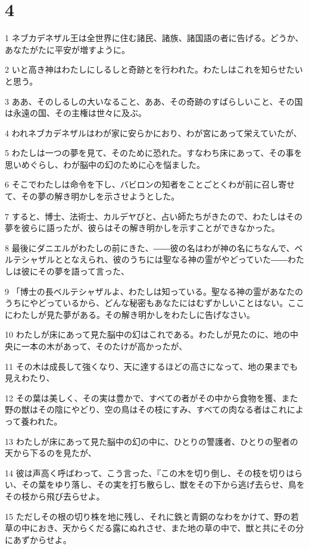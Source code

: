 \chapter{4}

\par 1 ネブカデネザル王は全世界に住む諸民、諸族、諸国語の者に告げる。どうか、あなたがたに平安が増すように。
\par 2 いと高き神はわたしにしるしと奇跡とを行われた。わたしはこれを知らせたいと思う。
\par 3 ああ、そのしるしの大いなること、ああ、その奇跡のすばらしいこと、その国は永遠の国、その主権は世々に及ぶ。
\par 4 われネブカデネザルはわが家に安らかにおり、わが宮にあって栄えていたが、
\par 5 わたしは一つの夢を見て、そのために恐れた。すなわち床にあって、その事を思いめぐらし、わが脳中の幻のために心を悩ました。
\par 6 そこでわたしは命令を下し、バビロンの知者をことごとくわが前に召し寄せて、その夢の解き明かしを示させようとした。
\par 7 すると、博士、法術士、カルデヤびと、占い師たちがきたので、わたしはその夢を彼らに語ったが、彼らはその解き明かしを示すことができなかった。
\par 8 最後にダニエルがわたしの前にきた、――彼の名はわが神の名にちなんで、ベルテシャザルととなえられ、彼のうちには聖なる神の霊がやどっていた――わたしは彼にその夢を語って言った、
\par 9 「博士の長ベルテシャザルよ、わたしは知っている。聖なる神の霊があなたのうちにやどっているから、どんな秘密もあなたにはむずかしいことはない。ここにわたしが見た夢がある。その解き明かしをわたしに告げなさい。
\par 10 わたしが床にあって見た脳中の幻はこれである。わたしが見たのに、地の中央に一本の木があって、そのたけが高かったが、
\par 11 その木は成長して強くなり、天に達するほどの高さになって、地の果までも見えわたり、
\par 12 その葉は美しく、その実は豊かで、すべての者がその中から食物を獲、また野の獣はその陰にやどり、空の鳥はその枝にすみ、すべての肉なる者はこれによって養われた。
\par 13 わたしが床にあって見た脳中の幻の中に、ひとりの警護者、ひとりの聖者の天から下るのを見たが、
\par 14 彼は声高く呼ばわって、こう言った、『この木を切り倒し、その枝を切りはらい、その葉をゆり落し、その実を打ち散らし、獣をその下から逃げ去らせ、鳥をその枝から飛び去らせよ。
\par 15 ただしその根の切り株を地に残し、それに鉄と青銅のなわをかけて、野の若草の中におき、天からくだる露にぬれさせ、また地の草の中で、獣と共にその分にあずからせよ。
